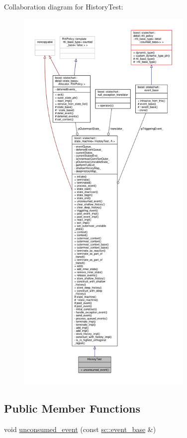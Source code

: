 Collaboration diagram for History\+Test\+:
\nopagebreak
\begin{figure}[H]
\begin{center}
\leavevmode
\includegraphics[height=550pt]{struct_history_test__coll__graph}
\end{center}
\end{figure}
\subsection*{Public Member Functions}
\begin{DoxyCompactItemize}
\item 
void \mbox{\hyperlink{struct_history_test_a1f30116031e8a0146c09aa1fce7958d4}{unconsumed\+\_\+event}} (const \mbox{\hyperlink{classboost_1_1statechart_1_1event__base}{sc\+::event\+\_\+base}} \&)
\end{DoxyCompactItemize}
